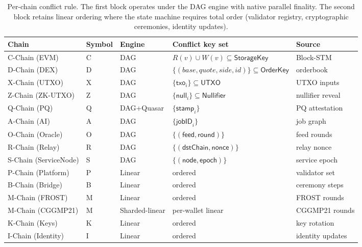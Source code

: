 \begin{table}[h]
\centering
\small
\begin{tabular}{lllll}
\toprule
\textbf{Chain} & \textbf{Symbol} & \textbf{Engine} & \textbf{Conflict key set} & \textbf{Source} \\
\midrule
C-Chain (EVM)         & C & DAG  & $R(v) \cup W(v) \subseteq \mathsf{StorageKey}$ & Block-STM \\
D-Chain (DEX)         & D & DAG  & $\{(base,quote,side,id)\} \subseteq \mathsf{OrderKey}$ & orderbook \\
X-Chain (UTXO)        & X & DAG  & $\{\mathsf{txo}_i\} \subseteq \mathsf{UTXO}$ & UTXO inputs \\
Z-Chain (ZK-UTXO)     & Z & DAG  & $\{\mathsf{null}_i\} \subseteq \mathsf{Nullifier}$ & nullifier reveal \\
Q-Chain (PQ)          & Q & DAG+Quasar & $\{\mathsf{stamp}_i\}$ & PQ attestation \\
A-Chain (AI)          & A & DAG  & $\{\mathsf{jobID}_i\}$ & job graph \\
O-Chain (Oracle)      & O & DAG  & $\{(\mathsf{feed},\mathsf{round})\}$ & feed rounds \\
R-Chain (Relay)       & R & DAG  & $\{(\mathsf{dstChain},\mathsf{nonce})\}$ & relay nonce \\
S-Chain (ServiceNode) & S & DAG  & $\{(\mathsf{node},\mathsf{epoch})\}$ & service epoch \\
\midrule
P-Chain (Platform)    & P & Linear & ordered         & validator set \\
B-Chain (Bridge)      & B & Linear & ordered         & ceremony steps \\
M-Chain (FROST)       & M & Linear & ordered         & FROST rounds \\
M-Chain (CGGMP21)     & M & Sharded-linear & per-wallet linear & CGGMP21 rounds \\
K-Chain (Keys)        & K & Linear & ordered         & key rotation \\
I-Chain (Identity)    & I & Linear & ordered         & identity updates \\
\bottomrule
\end{tabular}
\caption{Per-chain conflict rule. The first block operates under the DAG
engine with native parallel finality. The second block retains linear
ordering where the state machine requires total order (validator registry,
cryptographic ceremonies, identity updates).}
\label{tab:conflict}
\end{table}

